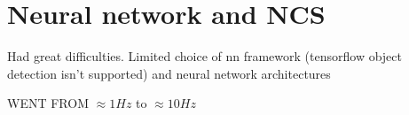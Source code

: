 \chapter{Neural network and NCS}

{\Large \color{red} Had great difficulties. Limited choice of nn framework (tensorflow object detection isn't supported) and neural network architectures }

{\Large \color{red} WENT FROM $\approx 1 Hz$ to $\approx 10 Hz$ }
